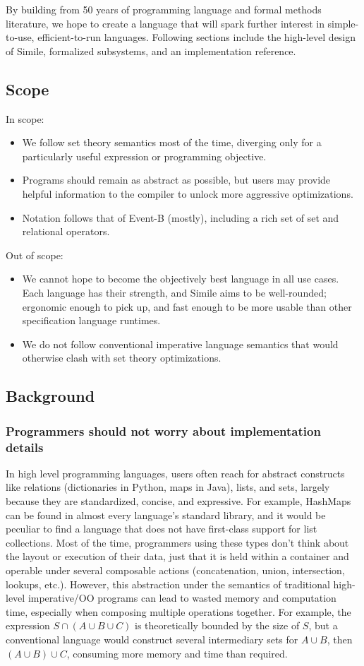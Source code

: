 \documentclass{article}
\begin{document}
By building from 50 years of programming language and formal methods literature, we hope to create a language that will spark further interest in simple-to-use, efficient-to-run languages. Following sections include the high-level design of Simile, formalized subsystems, and an implementation reference.

\subsection{Scope}
In scope:
\begin{itemize}
    \item We follow set theory semantics most of the time, diverging only for a particularly useful expression or programming objective.
    \item Programs should remain as abstract as possible, but users may provide helpful information to the compiler to unlock more aggressive optimizations.
    \item Notation follows that of Event-B (mostly), including a rich set of set and relational operators.
\end{itemize}
Out of scope:
\begin{itemize}
    \item We cannot hope to become the objectively best language in all use cases. Each language has their strength, and Simile aims to be well-rounded; ergonomic enough to pick up, and fast enough to be more usable than other specification language runtimes.
    \item We do not follow conventional imperative language semantics that would otherwise clash with set theory optimizations.
\end{itemize}

\subsection{Background}
\subsubsection{Programmers should not worry about implementation details}
In high level programming languages, users often reach for abstract constructs like relations (dictionaries in Python, maps in Java), lists, and sets, largely because they are standardized, concise, and expressive. For example, HashMaps can be found in almost every language's standard library, and it would be peculiar to find a language that does not have first-class support for list collections. Most of the time, programmers using these types don't think about the layout or execution of their data, just that it is held within a container and operable under several composable actions (concatenation, union, intersection, lookups, etc.). However, this abstraction under the semantics of traditional high-level imperative/OO programs can lead to wasted memory and computation time, especially when composing multiple operations together. For example, the expression $S \cap (A \cup B \cup C)$ is theoretically bounded by the size of $S$, but a conventional language would construct several intermediary sets for $A \cup B$, then $(A \cup B) \cup C$, consuming more memory and time than required.
\end{document}
